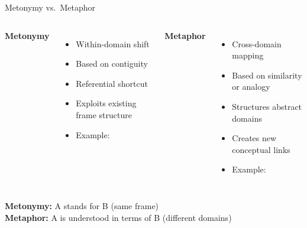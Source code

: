 \begin{frame}{Metonymy vs.\ Metaphor}

\begin{columns}[T]

\textbf{Metonymy}
\begin{itemize}
  \item Within-domain shift
  \item Based on contiguity
  \item Referential shortcut
  \item Exploits existing frame structure
  \item Example:  
\end{itemize}

\textbf{Metaphor}
\begin{itemize}
  \item Cross-domain mapping
  \item Based on similarity or analogy
  \item Structures abstract domains
  \item Creates new conceptual links
  \item Example:  
\end{itemize}

\end{columns}

\vspace{0.8em}

\centering
\textbf{Metonymy:} A stands for B (same frame) \\
\textbf{Metaphor:} A is understood in terms of B (different domains)

\end{frame}





